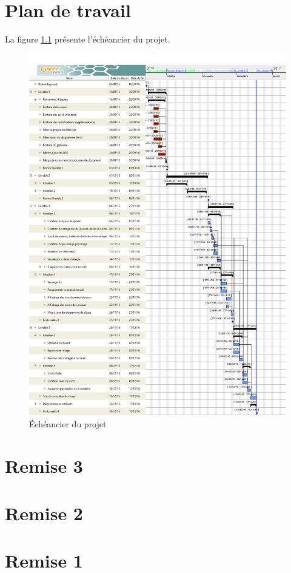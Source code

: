 \documentclass[ULlof]{ULrapport}
\begin{document}
\chapter{Plan de travail}

La figure \ref{fig:gantt} présente l'échéancier du projet.

\begin{figure}[p]
	\centering
	\includegraphics[scale=0.35, angle=0]{fig/diagrams4/gantt.png}
	\caption{Échéancier du projet}
	\label{fig:gantt}
\end{figure}

\appendix

\chapter{Remise 3}


\chapter{Remise 2}


\chapter{Remise 1}

\end{document}

